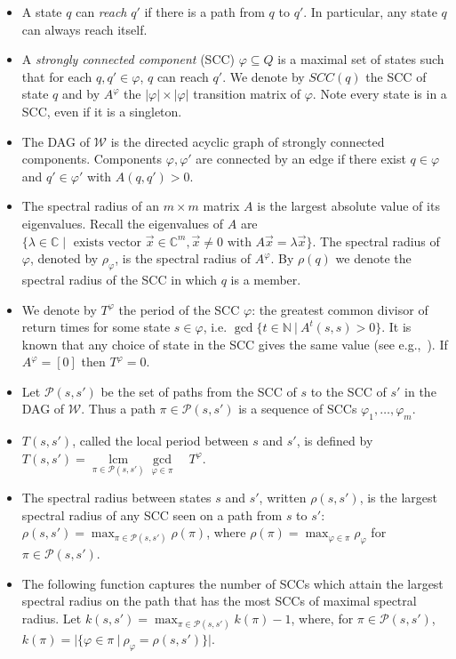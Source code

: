 \documentclass{lmcs}
\theoremstyle{plain}
\theoremstyle{definition}
\theoremstyle{remark}
\newcommand\period{T}
\newcommand{\scc}{\varphi}
\newcommand\wa{\mathcal{W}}
\begin{document}
\begin{defi}\hfill
\begin{itemize}
\item  A state $q$ can \textit{reach} $q'$ if there is a path from $q$ to $q'$. In particular, any state $q$ can always reach itself.
\item A \textit{strongly connected component} (SCC) $\scc \subseteq Q$ is a maximal set of states such that for each $q,q' \in \scc$, $q$ can reach $q'$. We denote by $SCC(q)$ the SCC of state $q$ and  by $A^\scc$ the $|\scc| \times |\scc|$ transition matrix of $\scc$. Note every state is in a SCC, even if it is a singleton.

\item
The DAG of $\wa$ is the directed acyclic graph of strongly connected components. Components $\scc, \scc'$ are connected by an edge if there exist $q\in\scc$ and $q'\in\scc'$ with $A(q,q') > 0$.

\item
The spectral radius of an $m\times m$ matrix $A$ is the largest absolute value of its eigenvalues. Recall the eigenvalues of $A$ are  $\{\lambda \in \mathbb{C} \mid \text{ exists vector } \vec{x} \in \mathbb{C}^m, \vec{x}\ne 0 \text{ with } A\vec{x} = \lambda \vec{x} \}$. The spectral radius of $\scc$, denoted by $\rho_\scc$, is the spectral radius of $A^\scc$. By $\rho(q)$ we denote the spectral radius of the SCC in which $q$ is a member. 

\item We denote by $\period^\scc$ the period of the SCC $\scc$: the greatest common divisor of return times for some state $s\in \scc$, i.e. $\operatorname*{gcd}\{t\in \mathbb{N} \ | \ A^t(s,s) > 0\}$. It is known that any choice of state in the SCC gives the same value (see e.g.,~\cite[Theorem 1.20]{sericola2013markov}). If  $A^\scc = [0]$ then $\period^\scc = 0$.
\item Let $\mathscr{P}(s,s')$ be the set of paths from the SCC of $s$ to the SCC of $s'$ in the DAG of $\wa$. Thus a path $\pi \in \mathscr{P}(s,s')$ is a sequence of SCCs $\scc_1, \dots, \scc_m$.
\item $\period(s,s')$, called the local period between $s$ and $s'$, is defined by $\period(s,s') = \operatorname*{lcm}\limits_{\pi \in \mathscr{P}(s,s')}\operatorname*{gcd}\limits_{\scc \in \pi}\quad \period^\scc$.
\item The spectral radius between states $s$ and $s'$, written $\rho(s,s')$, is the largest spectral radius of any SCC seen on a path from $s$ to $s'$:
$\rho(s,s') = \max_{\pi \in \mathscr{P}(s,s')} \rho(\pi)$,
where $\rho(\pi) = \max_{\scc \in \pi} \rho_\scc$ for  $\pi \in \mathscr{P}(s,s')$.
\item
 The following function captures the number of SCCs which attain the largest spectral radius on the path that has the most SCCs of maximal spectral radius. Let $k(s,s')  = \max_{\pi \in \mathscr{P}(s,s')} k(\pi) - 1$,
where, for $\pi \in \mathscr{P}(s,s')$, $k(\pi) = |\{\scc \in \pi \ |\  \rho_\scc = \rho(s,s') \}|$.

\end{itemize}
\end{defi}
\end{document}
